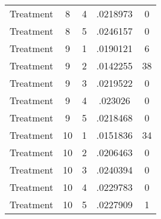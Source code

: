 \begin{tabular}{l*{4}{c}}
Treatment           &           8&           4&    .0218973&           0\\
Treatment           &           8&           5&    .0246157&           0\\
Treatment           &           9&           1&    .0190121&           6\\
Treatment           &           9&           2&    .0142255&          38\\
Treatment           &           9&           3&    .0219522&           0\\
Treatment           &           9&           4&     .023026&           0\\
Treatment           &           9&           5&    .0218468&           0\\
Treatment           &          10&           1&    .0151836&          34\\
Treatment           &          10&           2&    .0206463&           0\\
Treatment           &          10&           3&    .0240394&           0\\
Treatment           &          10&           4&    .0229783&           0\\
Treatment           &          10&           5&    .0227909&           1\\
\hline\hline
\end{tabular}

